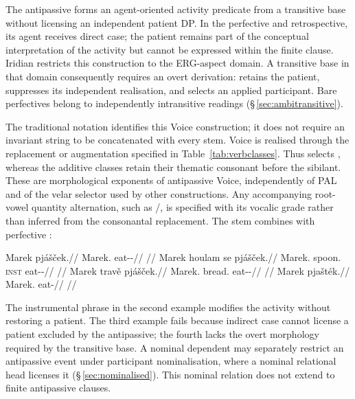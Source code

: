 The antipassive  forms an agent-oriented activity predicate from a
transitive base without licensing an independent patient DP. In the perfective
and retrospective, its agent receives direct case; the patient remains part of
the conceptual interpretation of the activity but cannot be expressed within
the finite clause. Iridian restricts this construction to the ERG-aspect domain.
A transitive base in that domain consequently requires an overt derivation:
 retains the patient,  suppresses its independent
realisation, and  selects an applied participant. Bare perfectives
belong to independently intransitive readings (§\,\ref{sec:ambitransitive}).

The traditional notation  identifies this Voice construction;
it does not require an invariant string  to be concatenated with
every stem. Voice is realised through the replacement or augmentation specified
in Table~\ref{tab:verbclasses}. Thus  selects ,
whereas the additive classes retain their thematic consonant before the
sibilant. These are morphological exponents of antipassive Voice, independently
of PAL and of the velar selector used by other constructions. Any accompanying
root-vowel quantity alternation, such as /, is specified
with its vocalic grade rather than inferred from the consonantal replacement.
The stem  combines with perfective :

\pex
\a
\begingl
\gla Marek pjášček.//
\glb Marek.\Dir{} eat-\Antip{}-\Pf{}//
\glft {}//
\endgl
\a
\begingl
\gla Marek houlam se pjášček.//
\glb Marek.\Dir{} spoon.\Ind{} \textsc{inst} eat-\Antip{}-\Pf{}//
\glft {}//
\endgl
\a
\begingl
\gla *Marek travě pjášček.//
\glb Marek.\Dir{} bread.\Ind{} eat-\Antip{}-\Pf{}//
\glft {}//
\endgl
\a
\begingl
\gla *Marek pjašték.//
\glb Marek.\Dir{} eat-\Pf{}//
\glft {}//
\endgl
\xe

The instrumental phrase in the second example modifies the activity without
restoring a patient. The third example fails because indirect case cannot
license a patient excluded by the antipassive; the fourth lacks the overt
morphology required by the transitive base. A nominal dependent may separately
restrict an antipassive event under participant nominalisation, where a nominal
relational head licenses it (§\,\ref{sec:nominalised}). This nominal relation
does not extend to finite antipassive clauses.



